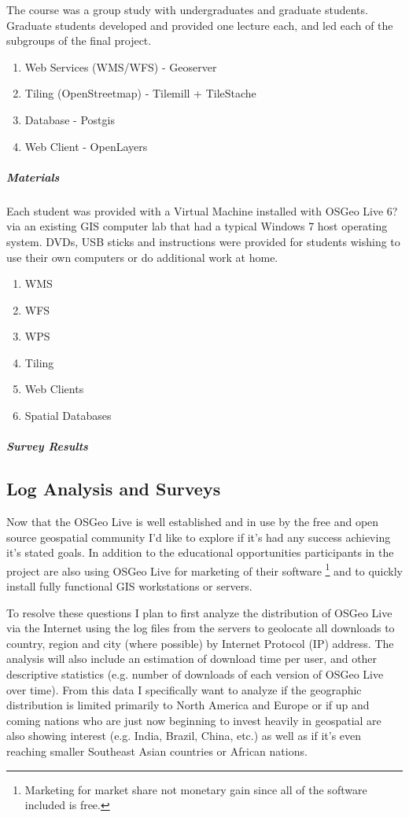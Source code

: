 \documentclass[12pt,letterpaper]{article}
\begin{document}
The course was a group study with undergraduates and graduate students. Graduate students developed and provided one lecture each, and led each of the subgroups of the final project.

\begin{enumerate}
\item Web Services (WMS/WFS) - Geoserver
\item Tiling (OpenStreetmap) - Tilemill + TileStache
\item Database - Postgis
\item Web Client - OpenLayers
\end{enumerate}

\subparagraph{Materials}
Each student was provided with a Virtual Machine installed with OSGeo Live 6? via an existing GIS computer lab that had a typical Windows 7 host operating system. DVDs, USB sticks and instructions were provided for students wishing to use their own computers or do additional work at home.

\begin{enumerate}
\item WMS
\item WFS
\item WPS
\item Tiling
\item Web Clients
\item Spatial Databases
\end{enumerate}

\subparagraph{Survey Results}


\subsection{Log Analysis and Surveys}
Now that the OSGeo Live is well established and in use by the free and open source geospatial community I'd like to explore if it's had any success achieving it's stated goals. In addition to the educational opportunities participants in the project are also using OSGeo Live for marketing of their software \footnote{Marketing for market share not monetary gain since all of the software included is free.} and to quickly install fully functional GIS workstations or servers.

To resolve these questions I plan to first analyze the distribution of OSGeo Live via the Internet using the log files from the servers to geolocate all downloads to country, region and city (where possible) by Internet Protocol (IP) address. The analysis will also include an estimation of download time per user, and other descriptive statistics (e.g. number of downloads of each version of OSGeo Live over time). From this data I specifically want to analyze if the geographic distribution is limited primarily to North America and Europe or if up and coming nations who are just now beginning to invest heavily in geospatial are also showing interest (e.g. India, Brazil, China, etc.) as well as if it's even reaching smaller Southeast Asian countries or African nations.
\end{document}
